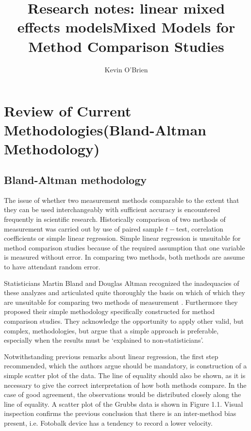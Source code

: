 \documentclass[12pt, a4paper]{report}
\title{Research notes: linear mixed effects models}
\author{ } \date{ }
\theoremstyle{plain}
\theoremstyle{definition}
\theoremstyle{remark}
\begin{document}
	\author{Kevin O'Brien}
	\title{Mixed Models for Method Comparison Studies}
	\tableofcontents
	
	\newpage
	\chapter{Review of Current Methodologies(Bland-Altman Methodology)}
	\section{Bland-Altman methodology}
	The issue of whether two measurement methods comparable to the
	extent that they can be used interchangeably with sufficient
	accuracy is encountered frequently in scientific research.
	Historically comparison of two methods of measurement was carried
	out by use of paired sample $t-$test, correlation coefficients or
	simple linear regression. Simple linear regression is unsuitable for method comparison studies because of the required assumption that one variable is measured without error. In comparing two methods, both methods are assume to have attendant random error.
	
	Statisticians Martin Bland and Douglas Altman recognized the inadequacies of these analyzes and
	articulated quite thoroughly the basis on which of which they are unsuitable for comparing two methods of measurement \citep*{BA83}. Furthermore they proposed their simple methodology specifically
	constructed for method comparison studies. They acknowledge the opportunity to apply other valid, but complex, methodologies, but argue that a simple approach is preferable, especially when the
	results must be `explained to non-statisticians'.
	
	Notwithstanding previous remarks about linear regression, the first step recommended, which the authors argue should be mandatory, is construction of a simple scatter plot of the data. The line of equality should also be shown, as it is necessary to give the correct interpretation of how both methods compare. In the case of good agreement, the observations would be distributed closely along the line of equality. A scatter plot of the Grubbs data is shown in Figure 1.1. Visual inspection confirms the previous conclusion that there is an inter-method bias present, i.e. Fotobalk device has a tendency to record a lower velocity.
	
	
\end{document}
